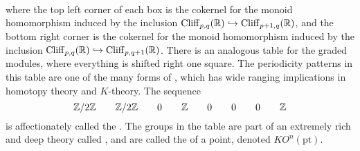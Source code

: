  \\\\\\
where the top left corner of each box is the cokernel for the monoid homomorphism
induced by the inclusion $\operatorname{Cliff}_{p,q}(\mathbb{R}) \hookrightarrow \operatorname{Cliff}_{p+1,q}(\mathbb{R})$,
and the bottom right  corner is the cokernel for the monoid homomorphism induced
by the inclusion $\operatorname{Cliff}_{p,q}(\mathbb{R}) \hookrightarrow \operatorname{Cliff}_{p,q+1}(\mathbb{R})$. There
is an analogous table for the graded modules, where everything is shifted right
one square. The periodicity patterns in this table are one of the many
forms of , which has wide ranging implications in homotopy
theory and $K$-theory. The sequence
\[
 \mathbb{Z}/2\mathbb{Z} \qquad \mathbb{Z}/2\mathbb{Z} \qquad 0 \qquad \mathbb{Z} \qquad 0 \qquad 0 \qquad 0 \qquad \mathbb{Z}
\]
is affectionately called the . The groups in the table are part of
an extremely rich and deep theory called , and are called the
 of a point, denoted $KO^n(\mathrm{pt})$.
%